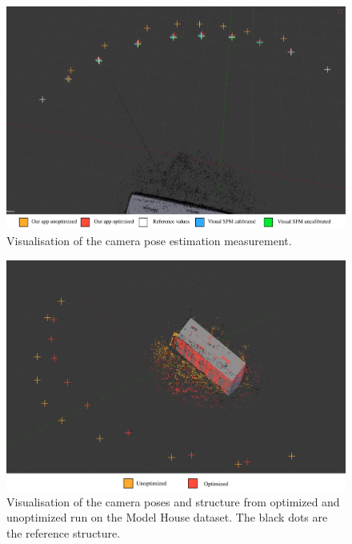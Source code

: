 \begin{figure}[!htbp]
	\begin{center}
		\includegraphics[keepaspectratio,width=\textwidth]{fig/pose_comparison.pdf}
	\end{center}
	\caption{Visualisation of the camera pose estimation measurement.}
	\label{fig:pose_comparison1}
\end{figure} 
\begin{figure}[!htbp]
	\begin{center}
		\includegraphics[keepaspectratio,width=\textwidth]{fig/pose_comparison2.pdf}
	\end{center}
	\caption{Visualisation of the camera poses and structure from optimized and unoptimized run on the Model House dataset. The black dots are the reference structure.}
	\label{fig:pose_comparison2}
\end{figure} 

